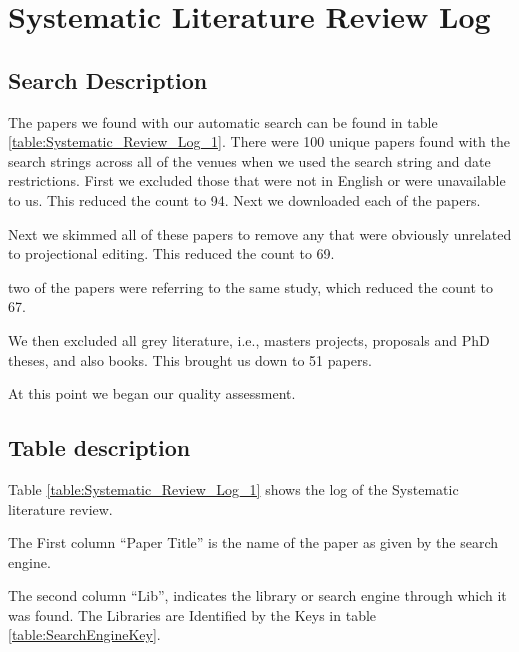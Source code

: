 \chapter{Systematic Literature Review Log} 
\label{Appendix:SLRLog}

\section*{Search Description} 
The papers we found with our automatic search can be found in table \ref{table:Systematic_Review_Log_1}.
There were 100 unique papers found with the search strings across all of the venues when we used the search string and date restrictions.
First we excluded those that were not in English or were unavailable to us.
This reduced the count to 94.
Next we downloaded each of the papers.

Next we skimmed all of these papers to remove any that were obviously unrelated to projectional editing.
This reduced the count to 69.

two of the papers were referring to the same study, which reduced the count to 67.

We then excluded all grey literature, i.e., masters projects, proposals and PhD theses, and also books.
This brought us down to 51 papers.

At this point we began our quality assessment.

\section*{Table description}
Table \ref{table:Systematic_Review_Log_1} shows the log of the Systematic literature review.

The First column ``Paper Title'' is the name of the paper as given by the search engine.

The second column ``Lib'', indicates the library or search engine through which it was found.
The Libraries are Identified by the Keys in table \ref{table:SearchEngineKey}.



